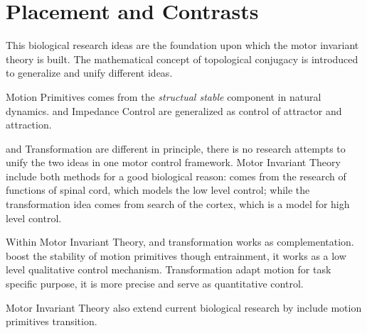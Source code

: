 \section{Placement and Contrasts}
This biological research ideas are the foundation upon which the motor invariant theory is built.
The mathematical concept of topological conjugacy is introduced to generalize and unify different ideas.

Motion Primitives comes from the \emph{structual stable} component in natural dynamics.
\eph and Impedance Control are generalized as control of attractor and attraction.

\cpg and Transformation are different in principle, there is no research attempts to unify the two ideas in one motor control framework.
Motor Invariant Theory include both methods for a good biological reason: \cpg comes from the research of functions of spinal cord, which models the low level control; while the transformation idea comes from search of the cortex, which is a model for high level control.
 
Within Motor Invariant Theory,  \cpg and transformation works as complementation.
\cpg boost the stability of motion primitives though entrainment, it works as a low level qualitative control mechanism.
Transformation adapt motion for task specific purpose, it is more precise and serve as quantitative control.

Motor Invariant Theory also extend current biological research by include motion primitives transition.


 

 



